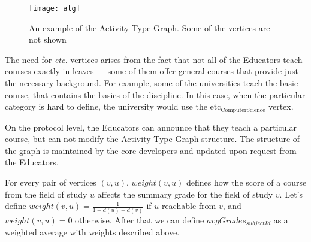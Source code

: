 \begin{figure}[ht]
\centering
\texttt{[image: atg]}
\caption{An example of the Activity Type Graph. Some of the vertices are not shown}
\label{fig:atg}
\end{figure}

The need for \textit{etc.} vertices arises from the fact that not all of the Educators teach courses exactly in leaves — some of them offer general courses that provide just the necessary background. For example, some of the universities teach the basic  course, that contains the basics of the discipline. In this case, when the particular category is hard to define, the university would use the $\textrm{etc}_{\textrm{ComputerScience}}$ vertex.

On the protocol level, the Educators can announce that they teach a particular course, but can not modify the Activity Type Graph structure. The structure of the graph is maintained by the core developers and updated upon request from the Educators.

For every pair of vertices $(v, u)$, $weight(v, u)$ defines how the score of a course from the field of study $u$ affects the summary grade for the field of study $v$. Let's define $weight(v, u) = \frac{1}{1 + d(u) - d(v)}$ if $u$ reachable from $v$, and $weight(v, u) = 0$ otherwise. After that we can define $avgGrades_{subjectId}$ as a weighted average with weights described above.
